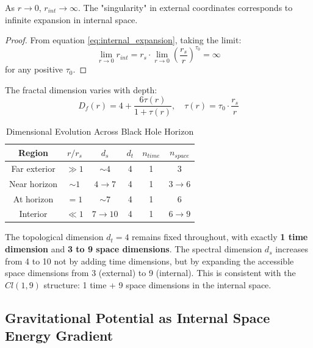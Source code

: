 \begin{corollary}
As $r \to 0$, $r_{int} \to \infty$. The "singularity" in external coordinates corresponds to infinite expansion in internal space.
\end{corollary}

\begin{proof}
From equation \eqref{eq:internal_expansion}, taking the limit:
\begin{equation}
    \lim_{r \to 0} r_{int} = r_s \cdot \lim_{r \to 0} \left(\frac{r_s}{r}\right)^{\tau_0} = \infty
\end{equation}
for any positive $\tau_0$.
\end{proof}

The fractal dimension varies with depth:
\begin{equation}
    D_f(r) = 4 + \frac{6\tau(r)}{1 + \tau(r)}, \quad \tau(r) = \tau_0 \cdot \frac{r_s}{r}
\end{equation}

\begin{table}[htbp]
\centering
\caption{Dimensional Evolution Across Black Hole Horizon}
\begin{tabular}{@{}cccccc@{}}
\hline
Region & $r/r_s$ & $d_s$ & $d_t$ & $n_{time}$ & $n_{space}$ \\
\hline
Far exterior & $\gg 1$ & $\sim 4$ & 4 & 1 & 3 \\
Near horizon & $\sim 1$ & $4 \to 7$ & 4 & 1 & $3 \to 6$ \\
At horizon & $= 1$ & $\sim 7$ & 4 & 1 & 6 \\
Interior & $\ll 1$ & $7 \to 10$ & 4 & 1 & $6 \to 9$ \\
\hline
\end{tabular}
\label{tab:dimensional_evolution}
\end{table}

\begin{remark}
The topological dimension $d_t = 4$ remains fixed throughout, with exactly \textbf{1 time dimension} and \textbf{3 to 9 space dimensions}. The spectral dimension $d_s$ increases from 4 to 10 not by adding time dimensions, but by expanding the accessible space dimensions from 3 (external) to 9 (internal). This is consistent with the $Cl(1,9)$ structure: 1 time + 9 space dimensions in the internal space.
\end{remark}

\subsection{Gravitational Potential as Internal Space Energy Gradient}

